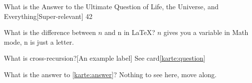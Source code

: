 \documentclass[a6paper,10pt,grid=front%
,toc
]{kartei}
\begin{document}
  \setcardpagelayout
  \begin{karte}{What is the Answer to the Ultimate Question of Life, the Universe, and Everything}[Super-relevant]
  42
  \end{karte}
  \begin{karte}[Numerology]{What is the difference between $n$ and n in LaTeX?}
  $n$ gives you a variable in Math mode, n is just a letter.
  \end{karte}
  \renewcommand{\kommentarstil}{\textsc}
  \begin{karte}{What is cross-recursion?}[An example label]
  \label{karte:answer} See card\ref{karte:question}
  \end{karte}
  \begin{karte}{What is the answer to \ref{karte:answer}?}
   \label{karte:question}
    Nothing to see here, move along.
  \end{karte}
\end{document}
